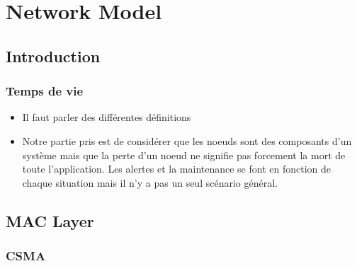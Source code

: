\chapter{Network Model} %
\label{cha:network_model}

\section{Introduction} %
\label{sec:introduction}


\subsection{Temps de vie} %
\label{sub:temps_de_vie}

\begin{itemize}
	\item Il faut parler des différentes définitions
	
	\item Notre partie pris est de considérer que les noeuds sont des composants
	d'un système mais que la perte d'un noeud ne signifie pas forcement la mort de toute
	l'application. Les alertes et la maintenance se font en fonction de chaque situation
	mais il n'y a pas un seul scénario général.

\end{itemize}






\section{MAC Layer} %
\label{sec:mac_layer}

\lipsum

\subsection{CSMA} %
\label{sub:csma}

